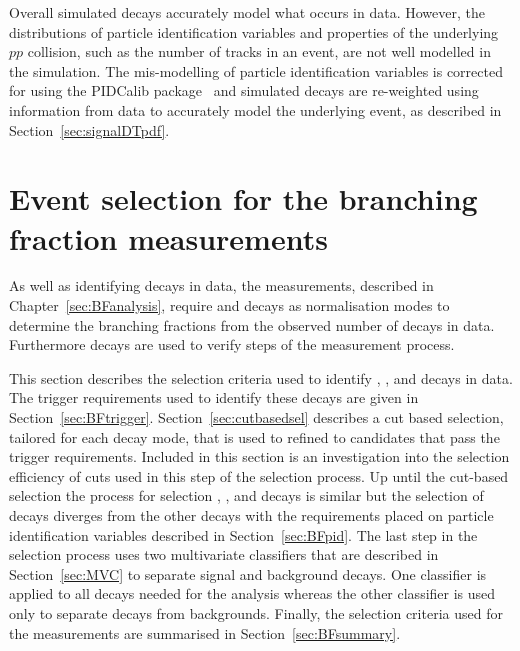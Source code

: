 Overall simulated decays accurately model what occurs in data. However, the distributions of particle identification variables and properties of the underlying $pp$ collision, such as the number of tracks in an event, are not well modelled in the simulation. %
The mis-modelling of particle identification variables is corrected for using the PIDCalib package~\cite{Anderlini:2202412} and simulated decays are re-weighted using information from data to accurately model the underlying event, as described in Section~\ref{sec:signalDTpdf}. 


\section[Event selection for the \bmumu branching fraction measurements]{Event selection for the \boldmath{\bmumu} branching fraction measurements}
\label{sec:BFsel}
As well as identifying \bmumu decays in data, the \BF measurements, described in Chapter~\ref{sec:BFanalysis}, require \bujpsik and \bhh decays as normalisation modes to determine the branching fractions from the observed number of \bmumu decays in data. 
Furthermore \bsjpsiphi decays are used to verify steps of the measurement process. 

This section describes the selection criteria used to identify \bmumu, \bhh, \bujpsik and \bsjpsiphi decays in data. The trigger requirements used to identify these decays are given in Section~\ref{sec:BFtrigger}. Section~\ref{sec:cutbasedsel} describes a cut based selection, tailored for each decay mode, that is used to refined to candidates that pass the trigger requirements. Included in this section is an investigation into the selection efficiency of cuts used in this step of the selection process. Up until the cut-based selection the process for selection \bmumu, \bhh, \bujpsik and \bsjpsiphi decays is similar but the selection of \bmumu decays diverges from the other decays with the requirements placed on particle identification variables described in Section~\ref{sec:BFpid}. The last step in the selection process uses two multivariate classifiers that are described in Section~\ref{sec:MVC} to separate signal and background decays. One classifier is applied to all decays needed for the \BF analysis whereas the other classifier is used only to separate \bmumu decays from backgrounds.
Finally, the selection criteria used for the \BF measurements are summarised in Section~\ref{sec:BFsummary}.


